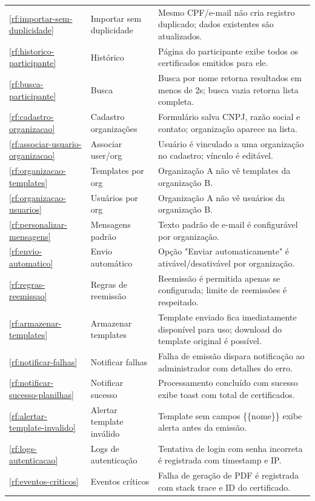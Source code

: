 \begin{longtable}{p{1cm} p{3.2cm} p{10.8cm}}
\ref{rf:importar-sem-duplicidade} & Importar sem duplicidade & Mesmo CPF/e-mail não cria registro duplicado; dados existentes são atualizados. \\
\ref{rf:historico-participante} & Histórico & Página do participante exibe todos os certificados emitidos para ele. \\
\ref{rf:busca-participante} & Busca & Busca por nome retorna resultados em menos de 2s; busca vazia retorna lista completa. \\
\midrule
\ref{rf:cadastro-organizacao} & Cadastro organizações & Formulário salva CNPJ, razão social e contato; organização aparece na lista. \\
\ref{rf:associar-usuario-organizacao} & Associar user/org & Usuário é vinculado a uma organização no cadastro; vínculo é editável. \\
\ref{rf:organizacao-templates} & Templates por org & Organização A não vê templates da organização B. \\
\ref{rf:organizacao-usuarios} & Usuários por org & Organização A não vê usuários da organização B. \\
\midrule
\ref{rf:personalizar-mensagens} & Mensagens padrão & Texto padrão de e-mail é configurável por organização. \\
\ref{rf:envio-automatico} & Envio automático & Opção "Enviar automaticamente" é ativável/desativável por organização. \\
\ref{rf:regras-reemissao} & Regras de reemissão & Reemissão é permitida apenas se configurada; limite de reemissões é respeitado. \\
\midrule
\ref{rf:armazenar-templates} & Armazenar templates & Template enviado fica imediatamente disponível para uso; download do template original é possível. \\
\midrule
\ref{rf:notificar-falhas} & Notificar falhas & Falha de emissão dispara notificação ao administrador com detalhes do erro. \\
\ref{rf:notificar-sucesso-planilhas} & Notificar sucesso & Processamento concluído com sucesso exibe toast com total de certificados. \\
\ref{rf:alertar-template-invalido} & Alertar template inválido & Template sem campos \{\{nome\}\} exibe alerta antes da emissão. \\
\midrule
\ref{rf:logs-autenticacao} & Logs de autenticação & Tentativa de login com senha incorreta é registrada com timestamp e IP. \\
\ref{rf:eventos-criticos} & Eventos críticos & Falha de geração de PDF é registrada com stack trace e ID do certificado. \\

\end{longtable}
